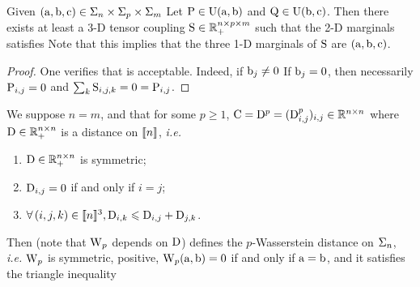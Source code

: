 \begin{lem}\label{lem-gluing-discr}
	Given $(\a,\b,\VectMode{c}) \in \simplex_n \times \simplex_p \times \simplex_m$ 
	Let $\P \in \CouplingsD(\a,\b)$ and $\Q \in \CouplingsD(\b,\VectMode{c})$. Then there exists at least a 3-D tensor coupling $\S \in \RR_+^{n \times p \times m}$ 
	such that the 2-D marginals satisfies 
	Note that this implies that the three 1-D marginals of $\S$ are $(\a,\b,\VectMode{c})$.
\end{lem}
\begin{proof}
	One verifies that
	is acceptable. Indeed, if $\b_j \neq 0$
	If $\b_j = 0$, then necessarily $\P_{i,j}=0$ and $\sum_{k} \S_{i,j,k} = 0 = \P_{i,j}$.
\end{proof}


\begin{prop}\label{prop-metric-histo}
We suppose $n=m$, and that for some $p \geq 1$, $\C=\distD^p=(\distD_{i,j}^p)_{i,j} \in \RR^{n \times n}$ where $\distD \in \RR_+^{n \times n}$ is a distance on $\range{n}$, \emph{i.e.}
\begin{enumerate}%
	\item $\distD \in \RR_+^{n \times n}$ is symmetric; 
	\item $\distD_{i,j}=0$ if and only if $i=j$; 
	\item $\foralls (i,j,k) \in \range{n}^3, \distD_{i,k} \leq \distD_{i,j}+\distD_{j,k}$.
\end{enumerate}
Then 
(note that $\WassD_p$ depends on $\distD$) defines the $p$-Wasserstein distance on $\Si_n$, \emph{i.e.} $\WassD_p$ is symmetric, positive, $\WassD_p(\a,\b)=0$ if and only if $\a = \b$, and it satisfies the triangle inequality
\end{prop}

